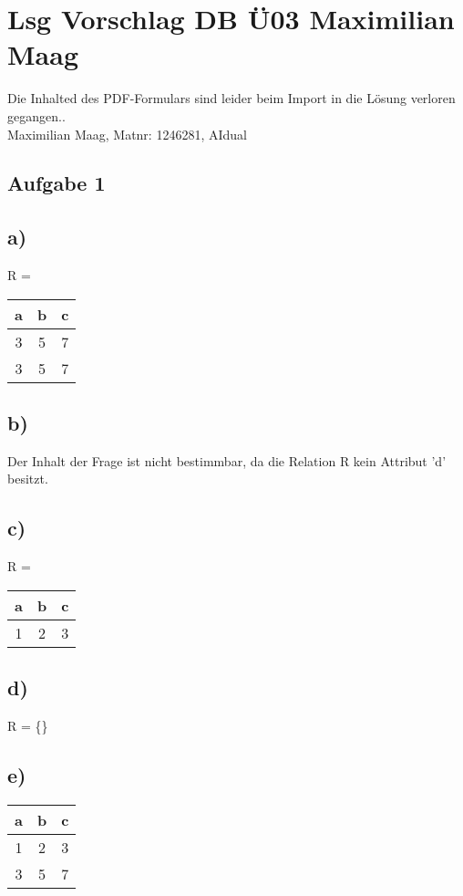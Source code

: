 \documentclass{article}
\begin{document}
	
	\section*{Lsg Vorschlag DB Ü03 Maximilian Maag}
	Die Inhalted des PDF-Formulars sind leider beim Import in die Lösung verloren gegangen.. \\
	Maximilian Maag, Matnr: 1246281, AIdual
	\subsection*{Aufgabe 1}
	\subsection*{a)}
	R = 
	\begin{tabular}{c|c|c}
		a & b & c \\
		\hline
		\hline
		3 & 5 & 7 \\
		\hline
		3 & 5 & 7
	\end{tabular}
	\subsection*{b)}
	Der Inhalt der Frage ist nicht bestimmbar, da die Relation R kein Attribut 'd' besitzt.
	\subsection*{c)}
	R = 
	\begin{tabular}{c|c|c}
		a & b & c \\
		\hline
		\hline
		1 & 2 & 3
	\end{tabular}
	\subsection*{d)}
	R = \{\}
	\subsection*{e)}
	\begin{tabular}{c|c|c}
		a & b & c \\
		\hline
		\hline
		1 & 2 & 3 \\
		\hline
		3 & 5 & 7
	\end{tabular}
\end{document}
